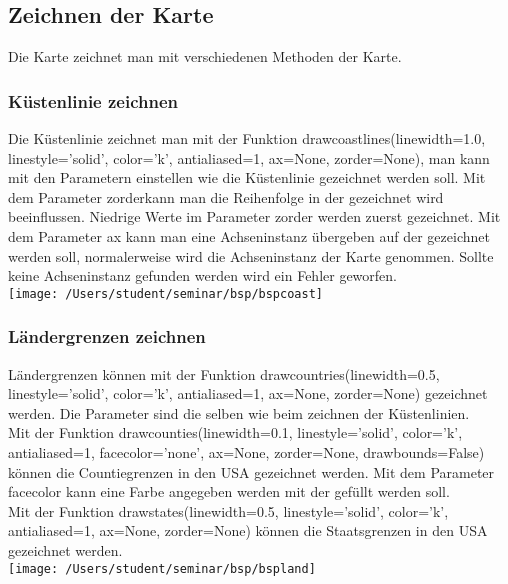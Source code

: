 \subsection{Zeichnen der Karte}
\label{sec:zeichnenkarte}
Die Karte zeichnet man mit verschiedenen Methoden der Karte.\\
\subsubsection*{Küstenlinie zeichnen}
Die Küstenlinie zeichnet man mit der Funktion \textsf{ drawcoastlines(linewidth=1.0, linestyle='solid', color='k', antialiased=1, ax=None, zorder=None)}, man kann mit den Parametern einstellen wie die Küstenlinie gezeichnet werden soll. Mit dem Parameter \textsf{zorder}kann man die Reihenfolge in der gezeichnet wird beeinflussen. Niedrige Werte im Parameter \textsf{zorder} werden zuerst gezeichnet.
Mit dem Parameter \textsf{ax} kann man eine Achseninstanz übergeben auf der gezeichnet werden soll, normalerweise wird die Achseninstanz der Karte genommen. Sollte keine Achseninstanz gefunden werden wird ein Fehler geworfen.\\

\texttt{[image: /Users/student/seminar/bsp/bspcoast]}\newpage 
\subsubsection*{Ländergrenzen zeichnen}
Ländergrenzen können mit der Funktion \textsf{ drawcountries(linewidth=0.5, linestyle='solid', color='k', antialiased=1, ax=None, zorder=None)} gezeichnet werden. Die Parameter sind die selben wie beim zeichnen der Küstenlinien. \\
Mit der Funktion \textsf{drawcounties(linewidth=0.1, linestyle='solid', color='k', antialiased=1, facecolor='none', ax=None, zorder=None, drawbounds=False)} können die Countiegrenzen in den USA gezeichnet werden. Mit dem Parameter \textsf{facecolor} kann eine Farbe angegeben werden mit der gefüllt werden soll.\\
Mit der Funktion \textsf{drawstates(linewidth=0.5, linestyle='solid', color='k', antialiased=1, ax=None, zorder=None)} können die Staatsgrenzen in den USA gezeichnet werden.\\

\texttt{[image: /Users/student/seminar/bsp/bspland]}\newpage 
